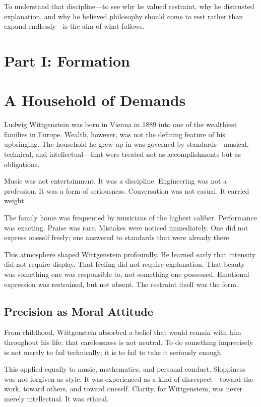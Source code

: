 \documentclass[11pt]{article}
\begin{document}
To understand that discipline—to see why he valued restraint, why he distrusted explanation, and why he believed philosophy should come to rest rather than expand endlessly—is the aim of what follows.

\newpage
\section*{Part I: Formation}

\section*{A Household of Demands}

Ludwig Wittgenstein was born in Vienna in 1889 into one of the wealthiest families in Europe. Wealth, however, was not the defining feature of his upbringing. The household he grew up in was governed by standards—musical, technical, and intellectual—that were treated not as accomplishments but as obligations.

Music was not entertainment. It was a discipline.  
Engineering was not a profession. It was a form of seriousness.  
Conversation was not casual. It carried weight.

The family home was frequented by musicians of the highest caliber. Performance was exacting. Praise was rare. Mistakes were noticed immediately. One did not express oneself freely; one answered to standards that were already there.

This atmosphere shaped Wittgenstein profoundly. He learned early that intensity did not require display. That feeling did not require explanation. That beauty was something one was responsible to, not something one possessed. Emotional expression was restrained, but not absent. The restraint itself was the form.

\subsection*{Precision as Moral Attitude}

From childhood, Wittgenstein absorbed a belief that would remain with him throughout his life: that carelessness is not neutral. To do something imprecisely is not merely to fail technically; it is to fail to take it seriously enough.

This applied equally to music, mathematics, and personal conduct. Sloppiness was not forgiven as style. It was experienced as a kind of disrespect—toward the work, toward others, and toward oneself. Clarity, for Wittgenstein, was never merely intellectual. It was ethical.
\end{document}
